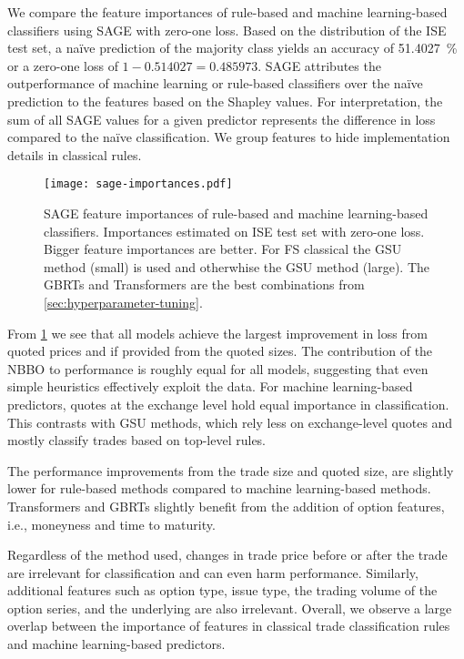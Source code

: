 We compare the feature importances of rule-based and machine learning-based classifiers using \gls{SAGE} with zero-one loss. Based on the distribution of the \gls{ISE} test set, a na\"ive prediction of the majority class yields an accuracy of \SI{51.4027}{\percent} or a zero-one loss of $1- \num{0.514027} = \num{0.485973}$. \gls{SAGE} attributes the outperformance of machine learning or rule-based classifiers over the na\"ive prediction to the features based on the Shapley values. For interpretation, the sum of all \gls{SAGE} values for a given predictor represents the difference in loss compared to the na\"ive classification. We group features to hide implementation details in classical rules.

\begin{figure}[h!]
    \centering
    \texttt{[image: sage-importances.pdf]}
    \caption[ Feature Importances]{\gls{SAGE} feature importances of rule-based and machine learning-based classifiers. Importances estimated on \gls{ISE} test set with zero-one loss. Bigger feature importances are better. For \gls{FS} classical the \gls{GSU} method (small) is used and otherwhise the \gls{GSU} method (large). The \glspl{GBRT} and Transformers are the best combinations from \cref{sec:hyperparameter-tuning}.}
    \label{fig:sage-importances}
\end{figure}

From \cref{fig:sage-importances} we see that all models achieve the largest improvement in loss from quoted prices and if provided from the quoted sizes. The contribution of the \gls{NBBO} to performance is roughly equal for all models, suggesting that even simple heuristics effectively exploit the data. For machine learning-based predictors, quotes at the exchange level hold equal importance in classification. This contrasts with \gls{GSU} methods, which rely less on exchange-level quotes and mostly classify trades based on top-level rules. 

The performance improvements from the trade size and quoted size, are slightly lower for rule-based methods compared to machine learning-based methods.  Transformers and \glspl{GBRT} slightly benefit from the addition of option features, i.e., moneyness and time to maturity. 

Regardless of the method used, changes in trade price before or after the trade are irrelevant for classification and can even harm performance. Similarly, additional features such as option type, issue type, the trading volume of the option series, and the underlying are also irrelevant. Overall, we observe a large overlap between the importance of features in classical trade classification rules and machine learning-based predictors.

